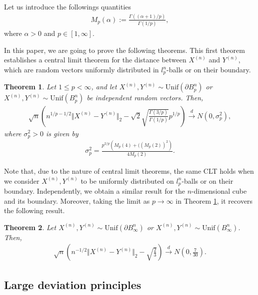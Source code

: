 \documentclass[10pt]{amsart}
\newtheorem{theorem}{Theorem}[section]
\newcounter{theor}
\numberwithin{equation}{section}
\begin{document}
Let us introduce the followings quantities 
\begin{align*}
M_p(\alpha) := \frac{\Gamma \left( (  \alpha + 1) / p \right) }{ \Gamma (1 / p )} ,
\end{align*}
where $\alpha >0$ and $p \in [1, \infty ]$.

In this paper, we are going to prove the following theorems. This first theorem establishes a central limit theorem for the distance between $X^{(n)}$ and $Y^{(n)}$, which are random vectors uniformly distributed in $l_p^n$-balls or on their boundary.

\begin{theorem}
\label{Thm:CLTforlpballs}
Let $1\leq p <\infty$, and let $X^{(n)},Y^{(n)} \sim \text{Unif}( \partial B_p^n)$ or $ X^{(n)},Y^{(n)} \sim \text{Unif}(B_p^n)$ be independent random vectors. Then,
\begin{align*}
\sqrt{n} \left( n^{1/p - 1/2} \Vert X^{(n)} - Y^{(n)} \Vert _2 -  \sqrt{2} \sqrt{\frac{\Gamma (3/p)}{\Gamma(1/p)}} p^{1/p}  \right) \overset{d}{\longrightarrow} N(0, \sigma_p ^2),
\end{align*}
where $\sigma_p ^2>0$ is given by
\begin{align*}
\sigma_p ^2 = \frac{p^{2/p} \left( M_p(4) + ((M_p(2))^2 \right)}{4 M_p(2)}.
\end{align*}
\end{theorem}

Note that, due to the nature of central limit theorems, the same CLT holds when we consider $X^{(n)}, Y^{(n)}$ to be uniformly distributed on $l_p^n$-balls or on their boundary. Independently, we obtain a similar result for the $n$-dimensional cube and its boundary. Moreover, taking the limit as $p \to \infty$ in Theorem \ref{Thm:CLTforlpballs}, it recovers the following result.

\begin{theorem}
\label{Thm:CLTforCube}
Let $X^{(n)},Y^{(n)} \sim \text{Unif}( \partial B_\infty ^n)$ or $X^{(n)},Y^{(n)} \sim \text{Unif}(B_\infty ^n)$. Then,
\begin{align*}
\sqrt{n} \left( n^{-1/2}  \Vert X^{(n)} - Y^{(n)} \Vert _2 - \sqrt{\frac{2}{3}}  \right) \overset{d}{\longrightarrow} N \left( 0, \frac{7}{30} \right).
\end{align*}
\end{theorem}



\subsection{Large deviation principles}
\end{document}

